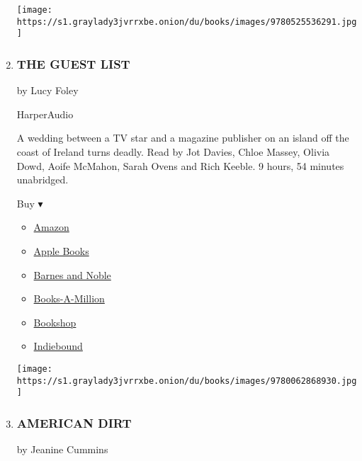 \begin{enumerate}
  \texttt{[image: https://s1.graylady3jvrrxbe.onion/du/books/images/9780525536291.jpg]}
\item
  \hypertarget{the-guest-list}{%
  \subsubsection{THE GUEST LIST}\label{the-guest-list}}

  by Lucy Foley

  HarperAudio

  A wedding between a TV star and a magazine publisher on an island off
  the coast of Ireland turns deadly. Read by Jot Davies, Chloe Massey,
  Olivia Dowd, Aoife McMahon, Sarah Ovens and Rich Keeble. 9 hours, 54
  minutes unabridged.

  Buy ▾

  \begin{itemize}
  \tightlist
  \item
    \href{https://www.amazon.com/dp/0062868934?tag=NYTBSREV-20\&tag=NYTBS-20}{Amazon}
  \item
    \href{https://du-gae-books-dot-nyt-du-prd.appspot.com/buy?title=THE+GUEST+LIST\&author=Lucy+Foley}{Apple
    Books}
  \item
    \href{https://www.anrdoezrs.net/click-7990613-11819508?url=https\%3A\%2F\%2Fwww.barnesandnoble.com\%2Fw\%2F\%3Fean\%3D9780062985057}{Barnes
    and Noble}
  \item
    \href{https://www.anrdoezrs.net/click-7990613-35140?url=https\%3A\%2F\%2Fwww.booksamillion.com\%2Fp\%2FTHE\%2BGUEST\%2BLIST\%2FLucy\%2BFoley\%2F9780062985057}{Books-A-Million}
  \item
    \href{https://bookshop.org/a/3546/9780062985057}{Bookshop}
  \item
    \href{https://www.indiebound.org/book/9780062985057?aff=NYT}{Indiebound}
  \end{itemize}

  \texttt{[image: https://s1.graylady3jvrrxbe.onion/du/books/images/9780062868930.jpg]}
\item
  \href{https://www.nytimes3xbfgragh.onion/2020/01/17/books/review-american-dirt-jeanine-cummins.html}{}

  \hypertarget{american-dirt}{%
  \subsubsection{AMERICAN DIRT}\label{american-dirt}}

  by Jeanine Cummins


\end{enumerate}
